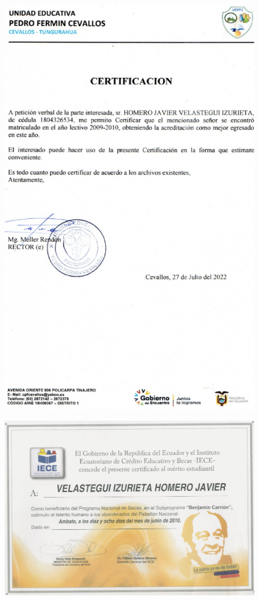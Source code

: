 \begin{figure}[ht]
    \setlength{\parindent}{-25pt}
    \includegraphics[width=\textwidth]{4.-Meritos/Certificados/3.png}
\end{figure}

\begin{figure}[ht]
    \setlength{\parindent}{-25pt}
    \includegraphics[width=\textwidth]{4.-Meritos/Certificados/2.png}
\end{figure}

